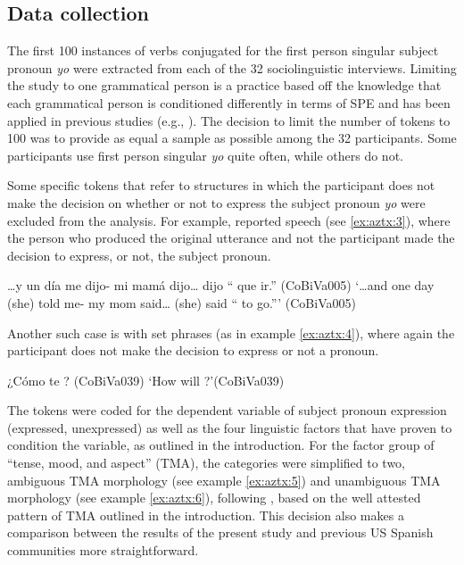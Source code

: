 \documentclass[output=paper]{langscibook}
\begin{document}
\subsection{Data collection}\label{sec:aztx:2.2}



The first 100 instances of verbs conjugated for the first person singular subject pronoun \textit{yo} were extracted from each of the 32 sociolinguistic interviews.  Limiting the study to one grammatical person is a practice based off the knowledge that each grammatical person is conditioned differently in terms of SPE and has been applied in previous studies (e.g., \citealt{LapidusOtheguy2005, TorresCacoullosTravis2010b, TorresCacoullosTravis2010a, LapidusShin2014, Bessett2018}). The decision to limit the number of tokens to 100 was to provide as equal a sample as possible among the 32 participants. Some participants use first person singular \textit{yo} quite often, while others do not.



Some specific tokens that refer to structures in which the participant does not make the decision on whether or not to express the subject pronoun \textit{yo} were excluded from the analysis. For example, reported speech (see \ref{ex:aztx:3}), where the person who produced the original utterance and not the participant made the decision to express, or not, the subject pronoun.




\ea\label{ex:aztx:3} …y un día me dijo- mi mamá dijo… dijo “{} que ir.” (CoBiVa005)
 \glt ‘…and one day (she) told me- my mom said… (she) said “{} to go.”’ (CoBiVa005)
\z 


Another such case is with set phrases (as in example \ref{ex:aztx:4}), where again the participant does not make the decision to express or not a pronoun.

\ea\label{ex:aztx:4}¿Cómo te {}? (CoBiVa039)
 \glt ‘How will {}?’(CoBiVa039)
\z 

The tokens were coded for the dependent variable of subject pronoun expression (expressed, unexpressed) as well as the four linguistic factors that have proven to condition the variable, as outlined in the introduction. For the factor group of “tense, mood, and aspect” (TMA), the categories were simplified to two, ambiguous TMA morphology (see example \ref{ex:aztx:5}) and unambiguous TMA morphology (see example \ref{ex:aztx:6}), following \citet{Cerrón-Palomino2016}, based on the well attested pattern of TMA outlined in the introduction. This decision also makes a comparison between the results of the present study and previous US Spanish communities more straightforward. 
\end{document}
